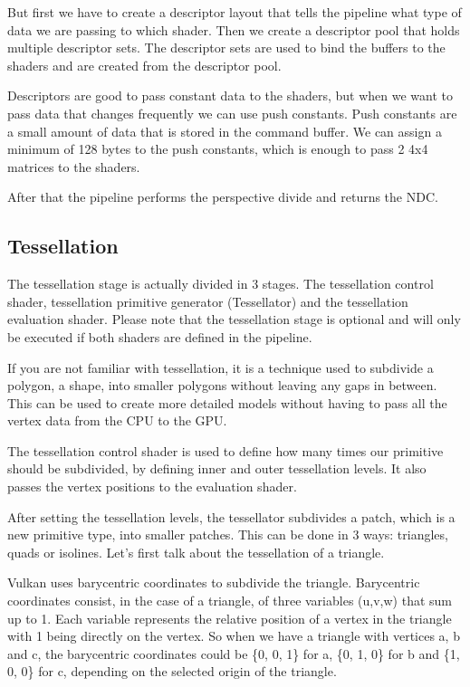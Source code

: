 \documentclass[12pt]{report} \usepackage{preamble}
\begin{document}
But first we have to create a descriptor layout that tells the pipeline
what type of data we are passing to which shader. Then we create a descriptor
pool that holds multiple descriptor sets. The descriptor sets are used to
bind the buffers to the shaders and are created from the descriptor pool. \cite{vulkan-tutorial-descriptors}

Descriptors are good to pass constant data to the shaders, but when we
want to pass data that changes frequently we can use push constants.
Push constants are a small amount of data that is stored in the command
buffer. We can assign a minimum of 128 bytes to the push constants, which
is enough to pass 2 4x4 matrices to the shaders. \cite{push-constants}

After that the pipeline performs the perspective divide and returns the
\ac{NDC}.

\subsection{Tessellation}

The tessellation stage is actually divided in 3 stages. The tessellation
control shader, tessellation primitive generator (Tessellator) and the tessellation
evaluation shader. Please note that the tessellation stage is optional and will
only be executed if both shaders are defined in the pipeline.\cite{tessellation}

If you are not familiar with tessellation, it is a technique used to
subdivide a polygon, a shape, into smaller polygons without leaving
any gaps in between. This can be used to create more detailed models
without having to pass all the vertex data from the \ac{CPU} to the \ac{GPU}. \cite{tessellation}

The tessellation control shader is used to define how many times
our primitive should be subdivided, by defining inner and outer tessellation levels.
It also passes the vertex positions to the evaluation shader. \cite{tessellation}

After setting the tessellation levels, the tessellator subdivides a patch, which is
a new primitive type, into smaller patches.
This can be done in 3 ways: triangles, quads or isolines.
Let's first talk about the tessellation of a triangle.

Vulkan uses barycentric coordinates to subdivide the triangle. Barycentric
coordinates consist, in the case of a triangle, of three variables (u,v,w) that sum up to 1.
Each variable represents the relative position of a vertex in the triangle with 1 being directly
on the vertex. So when we have a triangle with vertices a, b and c, the barycentric coordinates
could be \{0, 0, 1\} for a, \{0, 1, 0\} for b and \{1, 0, 0\} for c, depending on the selected
origin of the triangle. \cite{tessellation}
\end{document}
